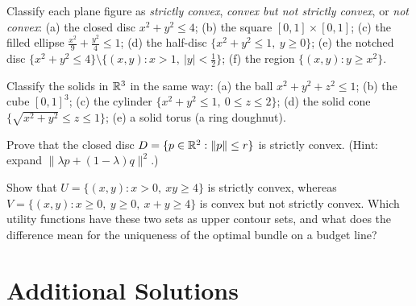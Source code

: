 \begin{problems}
  \item Classify each plane figure as \emph{strictly convex},
        \emph{convex but not strictly convex}, or \emph{not convex}:
        (a) the closed disc $x^{2}+y^{2}\le4$;
        (b) the square $[0,1]\times[0,1]$;
        (c) the filled ellipse $\tfrac{x^{2}}{9}+\tfrac{y^{2}}{4}\le1$;
        (d) the half-disc $\{x^{2}+y^{2}\le1,\ y\ge0\}$;
        (e) the notched disc
        $\{x^{2}+y^{2}\le4\}\setminus\{(x,y): x>1,\ |y|<\tfrac12\}$;
        (f) the region $\{(x,y): y\ge x^{2}\}$.
  \item Classify the solids in $\mathbb{R}^{3}$ in the same way:
        (a) the ball $x^{2}+y^{2}+z^{2}\le1$;
        (b) the cube $[0,1]^{3}$;
        (c) the cylinder $\{x^{2}+y^{2}\le1,\ 0\le z\le2\}$;
        (d) the solid cone $\{\sqrt{x^{2}+y^{2}}\le z\le1\}$;
        (e) a solid torus (a ring doughnut).
  \item Prove that the closed disc $D=\{p\in\mathbb{R}^{2}: \|p\|\le r\}$ is
        strictly convex. (Hint: expand
        $\|\lambda p+(1-\lambda)q\|^{2}$.)
  \item Show that $U=\{(x,y): x>0,\ xy\ge4\}$ is strictly convex, whereas
        $V=\{(x,y): x\ge0,\ y\ge0,\ x+y\ge4\}$ is convex but not strictly
        convex. Which utility functions have these two sets as upper contour
        sets, and what does the difference mean for the uniqueness of the
        optimal bundle on a budget line?
\end{problems}

\section{Additional Solutions}

